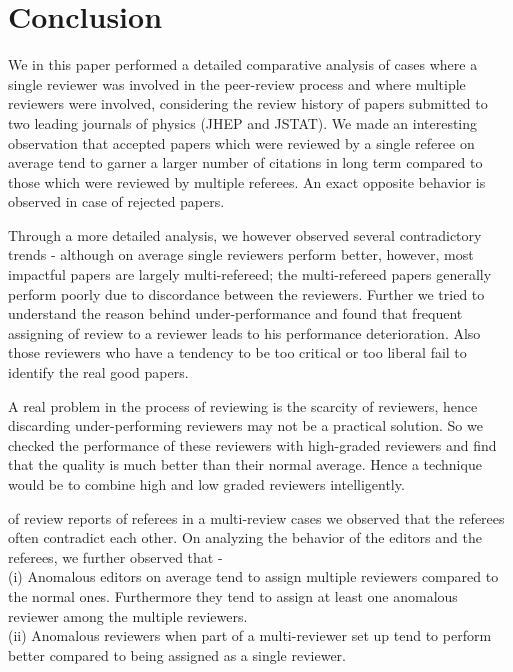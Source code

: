 \noindent
\section{Conclusion}
\label{conclusion}
We in this paper performed a detailed comparative analysis of cases where a single reviewer was involved in the peer-review process and where multiple reviewers were involved, considering the review history of papers submitted to two leading journals of physics (JHEP and JSTAT). 
We made an interesting observation  that accepted papers which were reviewed by a single referee on average tend to garner a larger number of citations in 
long term compared to those which were reviewed by multiple referees. An exact opposite behavior is observed in case of rejected papers. 

Through a more detailed analysis, we however observed several contradictory trends - although on average single reviewers perform better, however, 
most impactful papers are largely multi-refereed;  the multi-refereed papers generally perform poorly due to discordance between the reviewers.
Further we tried to understand the reason behind under-performance and found that frequent assigning of review to a reviewer leads to his performance deterioration. 
Also those reviewers who have a tendency to be too critical or too liberal fail to identify the real good papers. 

A real problem in the process of reviewing is the scarcity of reviewers, hence discarding under-performing reviewers may not be a practical solution. 
So we checked the performance of these reviewers with high-graded reviewers and find that the quality is much better than their normal average. Hence a 
technique would be to combine high and low graded reviewers intelligently. 

 of review reports of referees in a multi-review cases we observed that the referees often contradict each other. On analyzing the behavior of the editors and the referees, we further observed that - \\
(i) Anomalous editors on average tend to assign multiple reviewers compared to the normal ones. Furthermore they tend to assign at least one anomalous reviewer among the multiple reviewers. \\
(ii) Anomalous reviewers when part of a multi-reviewer set up tend to perform better compared to being assigned as a single reviewer.\\

